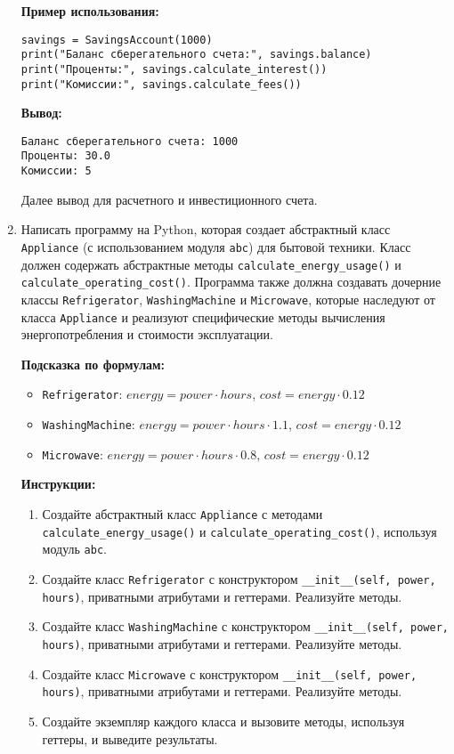 \begin{enumerate}
\textbf{Пример использования:}
\begin{verbatim}
savings = SavingsAccount(1000)
print("Баланс сберегательного счета:", savings.balance)
print("Проценты:", savings.calculate_interest())
print("Комиссии:", savings.calculate_fees())
\end{verbatim}

\textbf{Вывод:}
\begin{verbatim}
Баланс сберегательного счета: 1000
Проценты: 30.0
Комиссии: 5
\end{verbatim}

Далее вывод для расчетного и инвестиционного счета.

\item
Написать программу на Python, которая создает абстрактный класс \texttt{Appliance} (с использованием модуля \texttt{abc}) для бытовой техники. 
Класс должен содержать абстрактные методы \texttt{calculate\_energy\_usage()} и \texttt{calculate\_operating\_cost()}. 
Программа также должна создавать дочерние классы \texttt{Refrigerator}, \texttt{WashingMachine} и \texttt{Microwave}, 
которые наследуют от класса \texttt{Appliance} и реализуют специфические методы вычисления энергопотребления и стоимости эксплуатации.

\textbf{Подсказка по формулам:}
\begin{itemize}
    \item \texttt{Refrigerator}: $energy = power \cdot hours$, $cost = energy \cdot 0.12$
    \item \texttt{WashingMachine}: $energy = power \cdot hours \cdot 1.1$, $cost = energy \cdot 0.12$
    \item \texttt{Microwave}: $energy = power \cdot hours \cdot 0.8$, $cost = energy \cdot 0.12$
\end{itemize}

\textbf{Инструкции:}
\begin{enumerate}
    \item Создайте абстрактный класс \texttt{Appliance} с методами \texttt{calculate\_energy\_usage()} и \texttt{calculate\_operating\_cost()}, используя модуль \texttt{abc}.
    \item Создайте класс \texttt{Refrigerator} с конструктором \texttt{\_\_init\_\_(self, power, hours)}, приватными атрибутами и геттерами. Реализуйте методы.
    \item Создайте класс \texttt{WashingMachine} с конструктором \texttt{\_\_init\_\_(self, power, hours)}, приватными атрибутами и геттерами. Реализуйте методы.
    \item Создайте класс \texttt{Microwave} с конструктором \texttt{\_\_init\_\_(self, power, hours)}, приватными атрибутами и геттерами. Реализуйте методы.
    \item Создайте экземпляр каждого класса и вызовите методы, используя геттеры, и выведите результаты.
\end{enumerate}


\end{enumerate}
